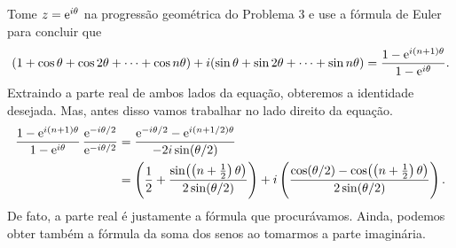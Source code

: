 \begin{questions}
\begin{solution}
    Tome $z=\mathrm{e}^{i\theta}$ na progressão geométrica do Problema 3 e use a fórmula de Euler para concluir que
    \[
        (1 + \cos \theta + \cos 2\theta + \cdots + \cos n\theta)
        + i (\sin \theta + \sin 2\theta + \cdots + \sin n\theta)
            = \frac{1 - \mathrm{e}^{i(n+1)\theta}}{1 - \mathrm{e}^{i\theta}}.
    \]
    Extraindo a parte real de ambos lados da equação, obteremos a identidade desejada. Mas, antes disso vamos trabalhar no lado direito da equação.
    \begin{align*}
        \frac{1 - \mathrm{e}^{i(n+1)\theta}}{1 - \mathrm{e}^{i\theta}}\, \frac{\mathrm{e}^{-i\theta/2}}{\mathrm{e}^{-i\theta/2}}
            &= \frac{\mathrm{e}^{-i\theta/2}-\mathrm{e}^{i(n+1/2)\theta}}{-2i\sin(\theta/2)} \\
            &= \left(\frac{1}{2} + \frac{\sin\!\left( \left(n + \frac{1}{2}\right)\theta\right)}{2\sin(\theta/2)} \right) + i\left(\frac{\cos(\theta/2) - \cos\!\left( \left(n + \frac{1}{2}\right)\theta\right)}{2\sin(\theta/2)} \right).
    \end{align*}
    De fato, a parte real é justamente a fórmula que procurávamos.
    Ainda, podemos obter também a fórmula da soma dos senos ao tomarmos a parte imaginária.
\end{solution}


\end{questions}
